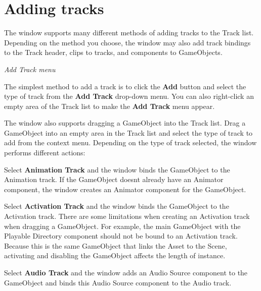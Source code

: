 \chapter{Adding tracks}
\hypertarget{md__library_2_package_cache_2com_8unity_8timeline_0d1_87_86_2_documentation_0i_2trk__add}{}\label{md__library_2_package_cache_2com_8unity_8timeline_0d1_87_86_2_documentation_0i_2trk__add}
\label{md__library_2_package_cache_2com_8unity_8timeline_0d1_87_86_2_documentation_0i_2trk__add_autotoc_md1256}%
%
 The  window supports many different methods of adding tracks to the Track list. Depending on the method you choose, the  window may also add track bindings to the Track header, clips to tracks, and components to Game\+Objects.



{\itshape Add Track menu}

The simplest method to add a track is to click the {\bfseries{Add}} button and select the type of track from the {\bfseries{Add Track}} drop-\/down menu. You can also right-\/click an empty area of the Track list to make the {\bfseries{Add Track}} menu appear.

The  window also supports dragging a Game\+Object into the Track list. Drag a Game\+Object into an empty area in the Track list and select the type of track to add from the context menu. Depending on the type of track selected, the  window performs different actions\+:


\begin{DoxyItemize}
\item Select {\bfseries{Animation Track}} and the  window binds the Game\+Object to the Animation track. If the Game\+Object doesn\textquotesingle{}t already have an Animator component, the  window creates an Animator component for the Game\+Object.
\item Select {\bfseries{Activation Track}} and the  window binds the Game\+Object to the Activation track. There are some limitations when creating an Activation track when dragging a Game\+Object. For example, the main Game\+Object with the Playable Directory component should not be bound to an Activation track. Because this is the same Game\+Object that links the  Asset to the Scene, activating and disabling the Game\+Object affects the length of  instance.
\item Select {\bfseries{Audio Track}} and the  window adds an Audio Source component to the Game\+Object and binds this Audio Source component to the Audio track. 
\end{DoxyItemize}